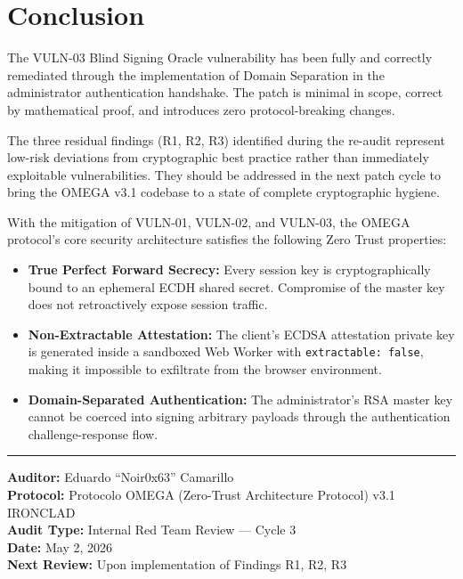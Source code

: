 \documentclass[12pt,a4paper]{article}
\begin{document}
\section{Conclusion}

The VULN-03 Blind Signing Oracle vulnerability has been fully and correctly remediated through the implementation of Domain Separation in the administrator authentication handshake. The patch is minimal in scope, correct by mathematical proof, and introduces zero protocol-breaking changes.

The three residual findings (R1, R2, R3) identified during the re-audit represent low-risk deviations from cryptographic best practice rather than immediately exploitable vulnerabilities. They should be addressed in the next patch cycle to bring the OMEGA v3.1 codebase to a state of complete cryptographic hygiene.

With the mitigation of VULN-01, VULN-02, and VULN-03, the OMEGA protocol's core security architecture satisfies the following Zero Trust properties:

\begin{itemize}
    \item \textbf{True Perfect Forward Secrecy:} Every session key is cryptographically bound to an ephemeral ECDH shared secret. Compromise of the master key does not retroactively expose session traffic.
    \item \textbf{Non-Extractable Attestation:} The client's ECDSA attestation private key is generated inside a sandboxed Web Worker with \texttt{extractable: false}, making it impossible to exfiltrate from the browser environment.
    \item \textbf{Domain-Separated Authentication:} The administrator's RSA master key cannot be coerced into signing arbitrary payloads through the authentication challenge-response flow.
\end{itemize}

\vspace{2em}
\hrule
\vspace{1em}
\noindent\textbf{Auditor:} Eduardo ``Noir0x63'' Camarillo\\
\textbf{Protocol:} Protocolo OMEGA (Zero-Trust Architecture Protocol) v3.1 IRONCLAD\\
\textbf{Audit Type:} Internal Red Team Review — Cycle 3\\
\textbf{Date:} May 2, 2026\\
\textbf{Next Review:} Upon implementation of Findings R1, R2, R3
\end{document}
